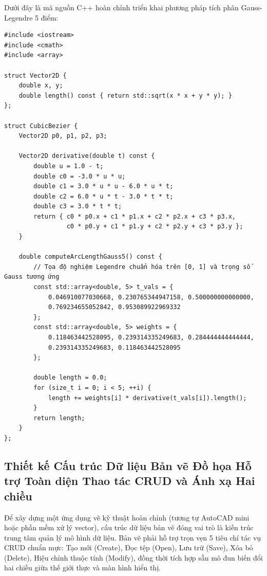 Dưới đây là mã nguồn C++ hoàn chỉnh triển khai phương pháp tích phân Gauss-Legendre 5 điểm:

\begin{verbatim}
#include <iostream>
#include <cmath>
#include <array>

struct Vector2D {
    double x, y;
    double length() const { return std::sqrt(x * x + y * y); }
};

struct CubicBezier {
    Vector2D p0, p1, p2, p3;

    Vector2D derivative(double t) const {
        double u = 1.0 - t;
        double c0 = -3.0 * u * u;
        double c1 = 3.0 * u * u - 6.0 * u * t;
        double c2 = 6.0 * u * t - 3.0 * t * t;
        double c3 = 3.0 * t * t;
        return { c0 * p0.x + c1 * p1.x + c2 * p2.x + c3 * p3.x,
                 c0 * p0.y + c1 * p1.y + c2 * p2.y + c3 * p3.y };
    }

    double computeArcLengthGauss5() const {
        // Tọa độ nghiệm Legendre chuẩn hóa trên [0, 1] và trọng số Gauss tương ứng
        const std::array<double, 5> t_vals = {
            0.046910077030668, 0.230765344947158, 0.500000000000000,
            0.769234655052842, 0.953089922969332
        };
        const std::array<double, 5> weights = {
            0.118463442528095, 0.239314335249683, 0.284444444444444,
            0.239314335249683, 0.118463442528095
        };

        double length = 0.0;
        for (size_t i = 0; i < 5; ++i) {
            length += weights[i] * derivative(t_vals[i]).length();
        }
        return length;
    }
};
\end{verbatim}

\subsection{Thiết kế Cấu trúc Dữ liệu Bản vẽ Đồ họa Hỗ trợ Toàn diện Thao tác CRUD và Ánh xạ Hai chiều}
\label{subsec:drawing_data_structure_crud}

Để xây dựng một ứng dụng vẽ kỹ thuật hoàn chỉnh (tương tự AutoCAD mini hoặc phần mềm xử lý vector), cấu trúc dữ liệu bản vẽ đóng vai trò là kiến trúc trung tâm quản lý mô hình dữ liệu. Bản vẽ phải hỗ trợ trọn vẹn 5 tiêu chí tác vụ CRUD chuẩn mực: Tạo mới (Create), Đọc tệp (Open), Lưu trữ (Save), Xóa bỏ (Delete), Hiệu chỉnh thuộc tính (Modify), đồng thời tích hợp sẵn mô đun biến đổi hai chiều giữa thế giới thực và màn hình hiển thị.

